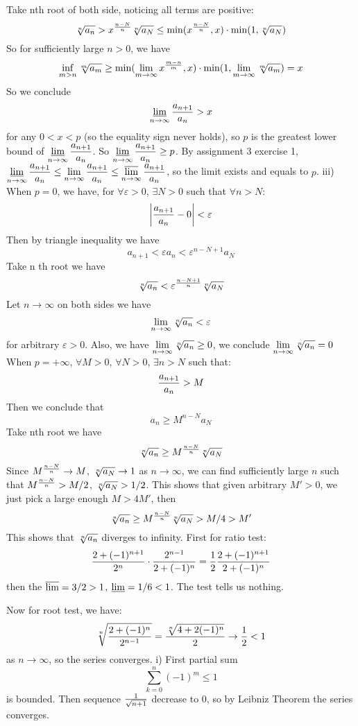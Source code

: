 Take nth root of both side, noticing all terms are positive:
$$
{\root n \of{ a_{n}}}>x^{n-N\over n}{\root n \of {a_N}}\le\min(x^{n-N\over n},x)\cdot \min(1,{\root n \of {a_N}})
$$
So for sufficiently large $n>0$, we have
$$
\inf_{m>n}\root m \of {a_m}\ge\min(\lim_{m\to \infty}x^{m-n\over m},x)\cdot \min(1,\lim_{m\to \infty}{\root m \of {a_m}})=x
$$
So we conclude 
$$
\varliminf_{n\to\infty}{a_{n+1}\over a_n}>x
$$
for any $0<x<p$ (so the equality sign never holds), so $p$ is the greatest lower bound of $\displaystyle\varliminf_{n\to\infty}{a_{n+1}\over a_n}$. So $\displaystyle\varliminf_{n\to\infty}{a_{n+1}\over a_n}\ge p$.
\smallskip
By assignment 3 exercise 1,  $\displaystyle\varliminf_{n\to\infty}{a_{n+1}\over a_n}\le\lim_{n\to\infty}{a_{n+1}\over a_n}\le\varlimsup_{n\to\infty}{a_{n+1}\over a_n}$, so the limit exists and equals to  $p$.
\medskip
\noindent iii) When $p=0$, we have, for $\forall \varepsilon>0$, $\exists N>0$ such that $\forall n>N$:
$$
\left|{a_{n+1}\over a_n}-0\right|<\varepsilon
$$
Then by triangle inequality we have 
$$
a_{n+1}<\varepsilon a_n<{\varepsilon}^{n-N+1} a_N
$$
Take n th root we have
$$
{\root n\of {a_n}}<{\varepsilon}^{n-N+1\over n} {\root n\of {a_N}}
$$
Let $n\to\infty$ on both sides we have
$$
\lim_{n\to\infty}{\root n\of {a_n}}<\varepsilon
$$
for arbitrary $\varepsilon>0$. Also, we have $\displaystyle\lim_{n\to\infty}{\root n\of {a_n}}\ge0$, we conclude $\displaystyle\lim_{n\to\infty}{\root n\of {a_n}}=0$
\smallskip
When $p=+\infty$, $\forall M>0$, $\forall N>0$, $\exists n>N$ such that:
$${a_{n+1}\over a_n}>M
$$
Then we conclude that
$$
a_n\ge M^{n-N}a_N
$$
Take nth root we have
$$
{\root n\of {a_n}}\ge M^{n-N\over n}{\root n\of {a_N}}
$$
Since $M^{n-N\over n}\to M$, ${\root n\of {a_N}}\to 1$ as $n\to \infty$, we can find sufficiently large $n$ such that $M^{n-N\over n}>M/2$, ${\root n\of {a_N}}> 1/2$. This shows that given arbitrary $M'>0$, we just pick a large enough $M>4M'$, then
$$
{\root n\of {a_n}}\ge M^{n-N\over n}{\root n\of {a_N}}>M/4>M'
$$
This shows that  ${\root n\of {a_n}}$ diverges to infinity. 
\bigskip
First for ratio test:
$$
{2+(-1)^{n+1}\over 2^n}\cdot{2^{n-1}\over 2+(-1)^n}={1\over2}{2+(-1)^{n+1}\over2+(-1)^n}
$$
then the $\varlimsup=3/2>1$, $\varliminf=1/6<1$. The test tells us nothing.

Now for root test, we have:
$$
{\root n\of {2+(-1)^n\over 2^{n-1}}}={{\root n\of{ 4+2(-1)^n} }\over2}\to {1\over2} <1
$$
as $n\to\infty$, so the series converges.
\bigskip
\noindent i) First partial sum 
$$
\sum_{k=0}^n(-1)^m\le1
$$
is bounded. Then sequence ${1\over\sqrt{n+1}}$ decrease to 0, so by Leibniz Theorem the series converges.

